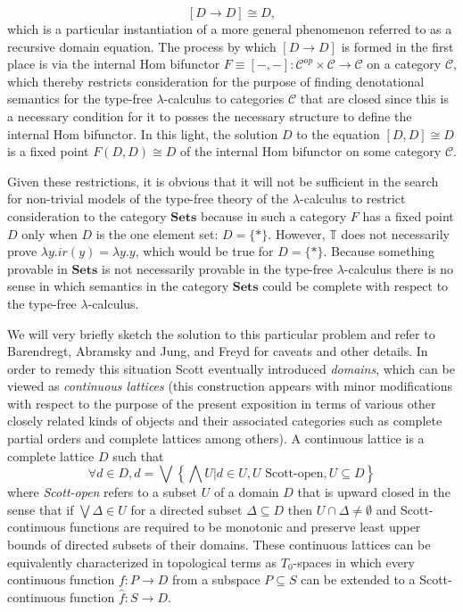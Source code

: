 $$
[D \rightarrow D] \cong D,
$$
which is a particular instantiation of a more general phenomenon referred to as a recursive domain equation. The process by which $[D \rightarrow D]$ is formed in the first place is via the internal Hom bifunctor $F \equiv [-,-] \colon \mathcal{C}^{op} \times \mathcal{C} \rightarrow \mathcal{C}$ on a category $\mathcal{C}$, which thereby restricts consideration for the purpose of finding denotational semantics for the type-free $\lambda$-calculus to categories $\mathcal{C}$ that are closed since this is a necessary condition for it to posses the necessary structure to define the internal Hom bifunctor. In this light, the solution $D$ to the equation $[D,D] \cong D$ is a fixed point $F(D,D) \cong D$ of the internal Hom bifunctor on some category $\mathcal{C}$.

Given these restrictions, it is obvious that it will not be sufficient in the search for non-trivial models of the type-free theory of the $\lambda$-calculus to restrict consideration to the category $\mathbf{Sets}$ because in such a category $F$ has a fixed point $D$ only when $D$ is the one element set: $D = \{*\}$. However, $\mathbb{T}$ does not necessarily prove $\lambda y.ir(y)=\lambda y.y$, which would be true for $D = \{*\}$. Because something provable in $\mathbf{Sets}$ is not necessarily provable in the type-free $\lambda$-calculus there is no sense in which semantics in the category $\mathbf{Sets}$ could be complete with respect to the type-free $\lambda$-calculus.

We will very briefly sketch the solution to this particular problem and refer to Barendregt, Abramsky and Jung, and Freyd for caveats and other details. In order to remedy this situation Scott eventually introduced \emph{domains}, which can be viewed as \emph{continuous lattices} (this construction appears with minor modifications with respect to the purpose of the present exposition in terms of various other closely related kinds of objects and their associated categories such as complete partial orders and complete lattices among others). A continuous lattice is a complete  lattice $D$ such that
$$
\forall d \in D, d = \bigvee \left\{ \bigwedge U | d \in U, U \mbox{ Scott-open}, U \subseteq D \right\}
$$
where \emph{Scott-open} refers to a subset $U$ of a domain $D$ that is upward closed in the sense that if $\bigvee \Delta \in U$ for a directed subset $\Delta \subseteq D$ then $U \cap \Delta \neq \emptyset$ and Scott-continuous functions are required to be monotonic and preserve least upper bounds of directed subsets of their domains. These continuous lattices can be equivalently characterized in topological terms as $T_0$-spaces in which every continuous function $f \colon P \rightarrow D$ from a subspace $P \subseteq S$ can be extended to a Scott-continuous function $\hat{f} \colon S \rightarrow D$.


